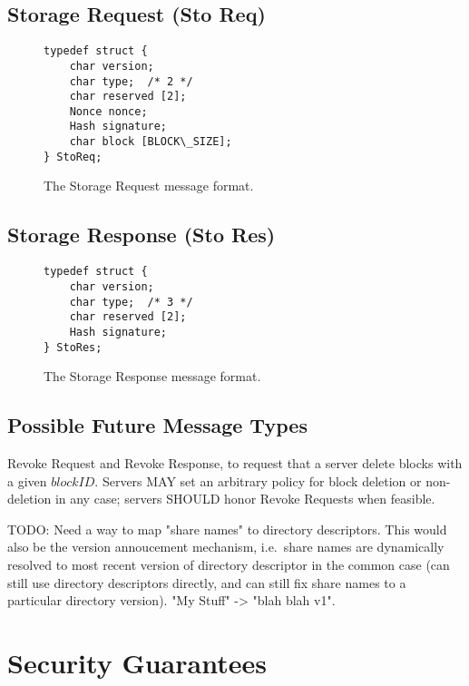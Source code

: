 \documentclass[letterpaper,9pt,twocolumn]{article}
\begin{document}
\subsection{Storage Request (Sto Req)}
\label{sec:StoReq}

\begin{figure}[t]
{\small \begin{verbatim}
typedef struct {
    char version;
    char type;  /* 2 */
    char reserved [2];
    Nonce nonce;
    Hash signature;
    char block [BLOCK\_SIZE];
} StoReq;
\end{verbatim} }
\caption{The Storage Request message format.}
\label{fig:StoReq}
\end{figure}

\subsection{Storage Response (Sto Res)}
\label{sec:StoRes}

\begin{figure}[t]
{\small \begin{verbatim}
typedef struct {
    char version;
    char type;  /* 3 */
    char reserved [2];
    Hash signature;
} StoRes;
\end{verbatim} }
\caption{The Storage Response message format.}
\label{fig:StoRes}
\end{figure}

\subsection{Possible Future Message Types}
\label{sec:future-messages}

Revoke Request and Revoke Response, to request that a server delete blocks
with a given $blockID$. Servers MAY set an arbitrary policy for block
deletion or non-deletion in any case; servers SHOULD honor Revoke Requests
when feasible.

TODO: Need a way to map "share names" to directory descriptors. This would
also be the version annoucement mechanism, i.e.\ share names are dynamically
resolved to most recent version of directory descriptor in the common case
(can still use directory descriptors directly, and can still fix share names
to a particular directory version). "My Stuff" -> "blah blah v1".


\section{Security Guarantees}
\end{document}
